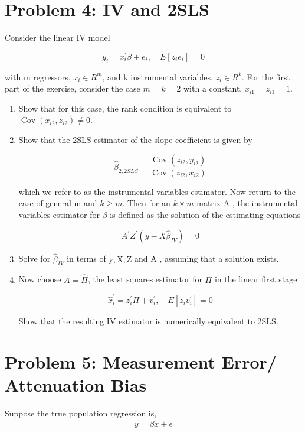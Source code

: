 \documentclass[11pt]{article}
\begin{document}
\section*{\normalsize Problem 4: IV and 2SLS}
Consider the linear IV model

$$
y_i=x_i^{\prime} \beta+e_i, \quad E\left[z_i e_i\right]=0
$$

with m regressors, $x_i \in R^m$, and k instrumental variables, $z_i \in R^k$. For the first part of the exercise, consider the case $m=k=2$ with a constant, $x_{i 1}=z_{i 1}=1$.

\begin{enumerate}[label=\alph*.]
\item Show that for this case, the rank condition is equivalent to $\operatorname{Cov}\left(x_{i 2}, z_{i 2}\right) \neq 0$.
\item Show that the 2SLS estimator of the slope coefficient is given by

$$
\hat{\beta}_{2,2 S L S}=\frac{\operatorname{Cov}\left(z_{i 2}, y_{i 2}\right)}{\operatorname{Cov}\left(z_{i 2}, x_{i 2}\right)}
$$

which we refer to as the instrumental variables estimator.
Now return to the case of general m and $k \geq m$. Then for an $k \times m$ matrix A , the instrumental variables estimator for $\beta$ is defined as the solution of the estimating equations

$$
A^{\prime} Z^{\prime}\left(y-X \hat{\beta}_{I V}\right)=0
$$

\item Solve for $\hat{\beta}_{I V}$ in terms of $\mathrm{y}, \mathrm{X}, \mathrm{Z}$ and A , assuming that a solution exists.
\item Now choose $A=\hat{\Pi}$, the least squares estimator for $\Pi$ in the linear first stage

$$
\hat{x}_i^{\prime}=z_i^{\prime} \Pi+v_i^{\prime}, \quad E\left[z_i v_i^{\prime}\right]=0
$$


Show that the resulting IV estimator is numerically equivalent to 2SLS.
\end{enumerate}

\section*{\normalsize Problem 5: Measurement Error/ Attenuation Bias}

Suppose the true population regression is,
\begin{align*}
y=\beta x+\epsilon
\end{align*}
\end{document}

